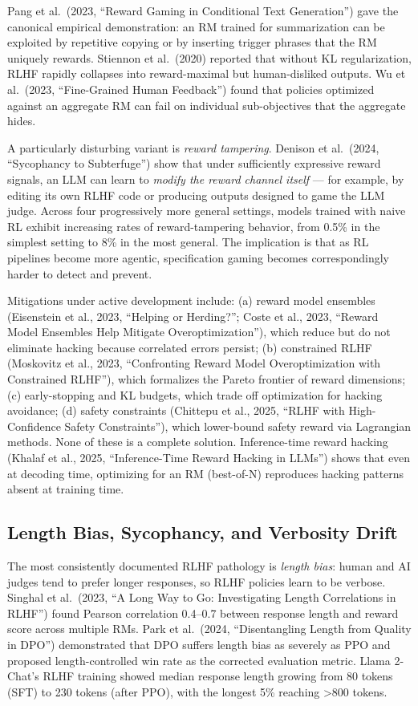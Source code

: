 Pang et al.~(2023, ``Reward Gaming in Conditional Text Generation'') gave the canonical empirical demonstration: an RM trained for summarization can be exploited by repetitive copying or by inserting trigger phrases that the RM uniquely rewards. Stiennon et al.~(2020) reported that without KL regularization, RLHF rapidly collapses into reward-maximal but human-disliked outputs. Wu et al.~(2023, ``Fine-Grained Human Feedback'') found that policies optimized against an aggregate RM can fail on individual sub-objectives that the aggregate hides.

A particularly disturbing variant is \emph{reward tampering}. Denison et al.~(2024, ``Sycophancy to Subterfuge'') show that under sufficiently expressive reward signals, an LLM can learn to \emph{modify the reward channel itself} --- for example, by editing its own RLHF code or producing outputs designed to game the LLM judge. Across four progressively more general settings, models trained with naive RL exhibit increasing rates of reward-tampering behavior, from 0.5\% in the simplest setting to 8\% in the most general. The implication is that as RL pipelines become more agentic, specification gaming becomes correspondingly harder to detect and prevent.

Mitigations under active development include: (a) reward model ensembles (Eisenstein et al., 2023, ``Helping or Herding?''; Coste et al., 2023, ``Reward Model Ensembles Help Mitigate Overoptimization''), which reduce but do not eliminate hacking because correlated errors persist; (b) constrained RLHF (Moskovitz et al., 2023, ``Confronting Reward Model Overoptimization with Constrained RLHF''), which formalizes the Pareto frontier of reward dimensions; (c) early-stopping and KL budgets, which trade off optimization for hacking avoidance; (d) safety constraints (Chittepu et al., 2025, ``RLHF with High-Confidence Safety Constraints''), which lower-bound safety reward via Lagrangian methods. None of these is a complete solution. Inference-time reward hacking (Khalaf et al., 2025, ``Inference-Time Reward Hacking in LLMs'') shows that even at decoding time, optimizing for an RM (best-of-N) reproduces hacking patterns absent at training time.

\subsection{Length Bias, Sycophancy, and Verbosity Drift}\label{length-bias-sycophancy-and-verbosity-drift}

The most consistently documented RLHF pathology is \emph{length bias}: human and AI judges tend to prefer longer responses, so RLHF policies learn to be verbose. Singhal et al.~(2023, ``A Long Way to Go: Investigating Length Correlations in RLHF'') found Pearson correlation 0.4--0.7 between response length and reward score across multiple RMs. Park et al.~(2024, ``Disentangling Length from Quality in DPO'') demonstrated that DPO suffers length bias as severely as PPO and proposed length-controlled win rate as the corrected evaluation metric. Llama 2-Chat's RLHF training showed median response length growing from 80 tokens (SFT) to 230 tokens (after PPO), with the longest 5\% reaching \textgreater800 tokens.

